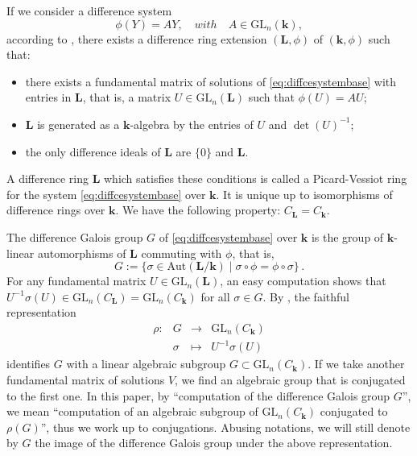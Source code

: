 \documentclass[a4paper,11pt]{amsart}
\newcommand{\GL}{\operatorname{GL}}
\def\k{\mathbf{k}}
\def\L{\mathbf{L}}
\def\GL{\mathrm{GL}}
\begin{document}
If we consider a difference system 
\begin{equation}
\label{eq:diffcesystembase}
    \phi(Y) = AY,\quad with \quad A\in \GL_n\left(\k\right),
\end{equation}
according to \cite[Section 1.1]{van2006galois}, there exists a difference ring extension $(\L,\phi)$ of $(\k,\phi)$ such that:
\begin{itemize}[label=$\bullet$]
    \item there exists a fundamental matrix of solutions of \eqref{eq:diffcesystembase} with entries in $\L$, that is, a matrix $U\in\GL_n\left(\L\right)$ such that $\phi\left(U\right)=AU$;
    \item $\L$ is generated as a $\k$-algebra by the entries of $U$ and $\det\left(U\right)^{-1}$;
    \item the only difference ideals of $\L$ are $\lbrace 0\rbrace$ and $\L$.
\end{itemize}
A difference ring $\L$ which satisfies these conditions is called a Picard-Vessiot ring for the system \eqref{eq:diffcesystembase} over $\k$. It is unique up to isomorphisms of difference rings over $\k$. We have the following property: $C_{\L} = C_{\k}$.

The difference Galois group $G$ of \eqref{eq:diffcesystembase} over $\k$ is the group of $\k$-linear automorphisms of $\L$ commuting with $\phi$, that is, 
$$
G:=\lbrace \sigma\in\text{Aut}(\L/\k)\mid \sigma\circ\phi=\phi\circ\sigma \rbrace \, .
$$
For any fundamental matrix $U \in \GL_n(\L)$, an easy computation shows that 
$U^{-1}\sigma(U) \in \GL_{n}(C_{\L})= \GL_{n}(C_{\k})$ for all $\sigma \in G$. 
By  \cite[Theorem~1.13]{van2006galois}, the faithful representation
$$
\begin{array}{rccl}
 \rho: & G & \rightarrow & \GL_{n}(C_{\k}) \\ 
   & \sigma & \mapsto & U^{-1}\sigma(U)
\end{array}
$$
identifies $G $ with a linear algebraic subgroup $G\subset\GL_{n}(C_{\k})$.  If we take another fundamental matrix of solutions $V$, we find an algebraic group that is conjugated to the first one. 
In this paper, by ``computation of the difference Galois group $G$'', we mean ``computation of an algebraic subgroup of $\GL_n\left(C_{\k}\right)$ conjugated to $\rho(G)$'', thus we work up to conjugations.  Abusing notations, we will still denote by $G$ the image of the difference Galois group under the above representation.\par
\end{document}
